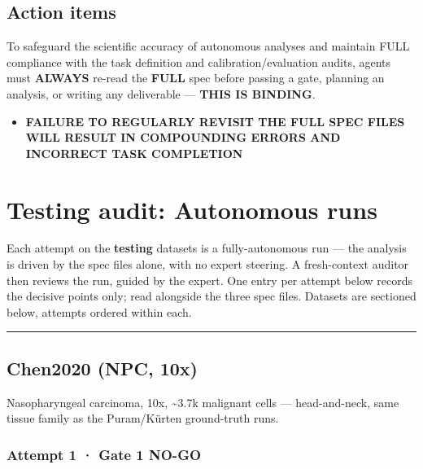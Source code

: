 \documentclass[11pt,a4paper]{article}
\providecommand{\tightlist}{\setlength{\itemsep}{0pt}\setlength{\parskip}{0pt}}
\begin{document}
\hypertarget{action-items}{%
\subsection{Action items}\label{action-items}}

To safeguard the scientific accuracy of autonomous analyses and maintain
FULL compliance with the task definition and calibration/evaluation
audits, agents must \textbf{ALWAYS} re-read the \textbf{FULL} spec
before passing a gate, planning an analysis, or writing any deliverable
--- \textbf{THIS IS BINDING}.

\begin{itemize}
\tightlist
\item
  \textbf{FAILURE TO REGULARLY REVISIT THE FULL SPEC FILES WILL RESULT
  IN COMPOUNDING ERRORS AND INCORRECT TASK COMPLETION}
\end{itemize}

\hypertarget{sec:4}{%
\section{Testing audit: Autonomous runs}\label{sec:4}}

Each attempt on the \textbf{testing} datasets is a fully-autonomous run
--- the analysis is driven by the spec files alone, with no expert
steering. A fresh-context auditor then reviews the run, guided by the
expert. One entry per attempt below records the decisive points only;
read alongside the three spec files. Datasets are sectioned below,
attempts ordered within each.

\begin{center}\rule{0.5\linewidth}{0.5pt}\end{center}

\hypertarget{chen-2020-npc-10x}{%
\subsection{Chen2020 (NPC, 10x)}\label{chen-2020-npc-10x}}

Nasopharyngeal carcinoma, 10x, \textasciitilde3.7k malignant cells ---
head-and-neck, same tissue family as the Puram/Kürten ground-truth runs.

\hypertarget{attempt-1-gate-1-no-go}{%
\subsubsection{Attempt 1 · Gate 1 NO-GO}\label{attempt-1-gate-1-no-go}}
\end{document}
